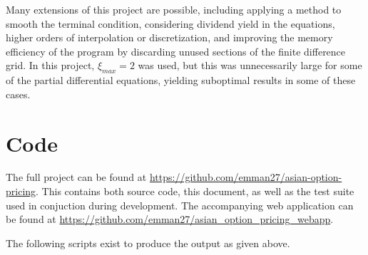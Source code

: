 \documentclass[12pt]{report}
\begin{document}
Many extensions of this project are possible, including applying a method to smooth the terminal condition, considering dividend yield in the equations, higher orders of interpolation or discretization, and improving the memory efficiency of the program by discarding unused sections of the finite difference grid. In this project, \(\xi_{max}=2\) was used, but this was unnecessarily large for some of the partial differential equations, yielding suboptimal results in some of these cases.


\printbibliography

\appendix

\chapter{Code}

\sloppy
The full project can be found at \url{https://github.com/emman27/asian-option-pricing}. This contains both source code, this document, as well as the test suite used in conjuction during development. The accompanying web application can be found at \url{https://github.com/emman27/asian_option_pricing_webapp}.

The following scripts exist to produce the output as given above.

\scriptsize

\normalsize

\scriptsize

\normalsize
\end{document}
